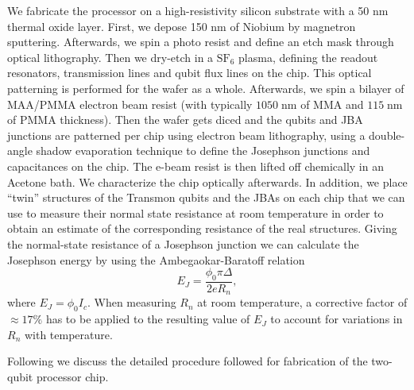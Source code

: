 We fabricate the processor on a high-resistivity silicon substrate with a 50 nm thermal oxide layer. First, we depose 150 nm of Niobium by magnetron sputtering. Afterwards, we spin a photo resist and define an etch mask through optical lithography. Then we dry-etch in a $\mathrm{SF}_6$ plasma, defining the readout resonators, transmission lines and qubit flux lines on the chip. This optical patterning is performed for the wafer as a whole. Afterwards, we spin a bilayer of MAA/PMMA electron beam resist (with typically $1050\;\mathrm{nm}$ of MMA and $115\;\mathrm{nm}$ of PMMA thickness). Then the wafer gets diced and the qubits and JBA junctions are patterned per chip using electron beam lithography, using a double-angle shadow evaporation technique to define the Josephson junctions and capacitances on the chip. The e-beam resist is then lifted off chemically in an Acetone bath. We characterize the chip optically afterwards. In addition, we place ``twin'' structures of the Transmon qubits and the JBAs on each chip that we can use to measure their normal state resistance at room temperature in order to obtain an estimate of the corresponding resistance of the real structures. Giving the normal-state resistance of a Josephson junction we can calculate the Josephson energy by using the Ambegaokar-Baratoff relation
%
\begin{equation}
E_J = \frac{\phi_0 \pi\Delta}{2e R_n},
\end{equation}
%
where $E_J = \phi_0 I_c$. When measuring $R_n$ at room temperature, a corrective factor of $\approx 17\%$ has to be applied to the resulting value of $E_J$ to account for variations in $R_n$ with temperature. 

\smallskip

Following we discuss the detailed procedure followed for fabrication of the two-qubit processor chip.

